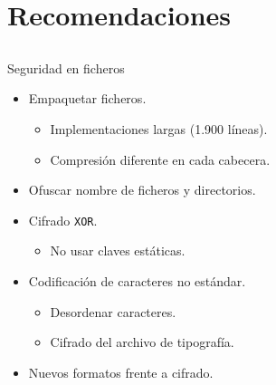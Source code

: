 
\section{Recomendaciones}
\subsection{}

\begin{frame}{Seguridad en ficheros}

\begin{itemize}
    \item<2-> Empaquetar ficheros.
    \begin{itemize}
        \item<3-> Implementaciones largas (1.900 líneas).
        \item<4-> Compresión diferente en cada cabecera.
    \end{itemize}

    \item<5-> Ofuscar nombre de ficheros y directorios.
\end{itemize}

\begin{itemize}
    \item<7-> Cifrado \texttt{XOR}.
    \begin{itemize}
        \item<8-> No usar claves estáticas.
    \end{itemize}

    \item<9-> Codificación de caracteres no estándar.
    \begin{itemize}
        \item<10-> Desordenar caracteres.
        \item<11-> Cifrado del archivo de tipografía.
    \end{itemize}

    \item<12-> Nuevos formatos frente a cifrado.
\end{itemize}

\end{frame}


